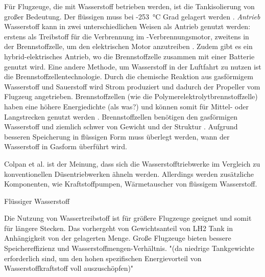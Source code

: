 Für Flugzeuge, die mit Wasserstoff betrieben werden, ist die Tankisolierung von großer Bedeutung. 
Der flüssigen  muss bei -253 °C Grad gelagert werden \cite{colpan2022fuel}.
%
%
%
\textit{Antrieb}\\
Wasserstoff kann in zwei unterschiedlichen Weisen als Antrieb genutzt werden: 
erstens als Treibstoff für die Verbrennung im -Verbrennungsmotor,
zweitens in der Brennstoffzelle, um den elektrischen Motor anzutreiben \cite{sky2020hydrogen}. Zudem gibt es ein hybrid-elektrisches Antrieb,
wo die Brennstoffzelle zusammen mit einer Batterie genutzt wird.
%
Eine andere Methode, um Wasserstoff in der Luftfahrt zu nutzen ist die Brennstoffzellentechnologie.
Durch die chemische Reaktion aus gasförmigem Wasserstoff  und Sauerstoff  wird Strom produziert \cite{dalmia2022powering} und 
dadurch der Propeller vom Flugzeug angetrieben.
Brennstoffzellen (wie die Polymerelektrolytbrennstoffzelle) haben eine höhere Energiedichte (als was?) und 
können somit für Mittel- oder Langstrecken genutzt werden \cite{dalmia2022powering}. 
Brennstoffzellen benötigen den gasförmigen Wasserstoff \cite{colpan2022fuel} und ziemlich schwer von Gewicht und der Struktur \cite{hepperle2012electric}. 
Aufgrund besseren Speicherung in flüssigen Form muss überlegt werden, wann der Wasserstoff in Gasform überführt wird. 


Colpan et al. \cite{colpan2022fuel} ist der Meinung, dass sich die Wasserstofftriebwerke im Vergleich zu konventionellen Düsentriebwerken ähneln werden. 
Allerdings werden zusätzliche Komponenten, wie Kraftstoffpumpen, Wärmetauscher von flüssigem Wasserstoff.

Flüssiger Wasserstoff

Die Nutzung von Wassertreibstoff ist für größere Flugzeuge geeignet und somit für längere Stecken. Das vorhergeht von %
Gewichtsanteil von LH2 Tank in Anhängigkeit von der gelagerten Menge. 
Große Flugzeuge bieten bessere Speichereffizienz und Wasserstoffmengen-Verhältnis.
"(da niedrige Tankgewichte erforderlich sind, um den hohen spezifischen Energievorteil von Wasserstoffkraftstoff voll auszuschöpfen)"
\cite{ansell2023review}


